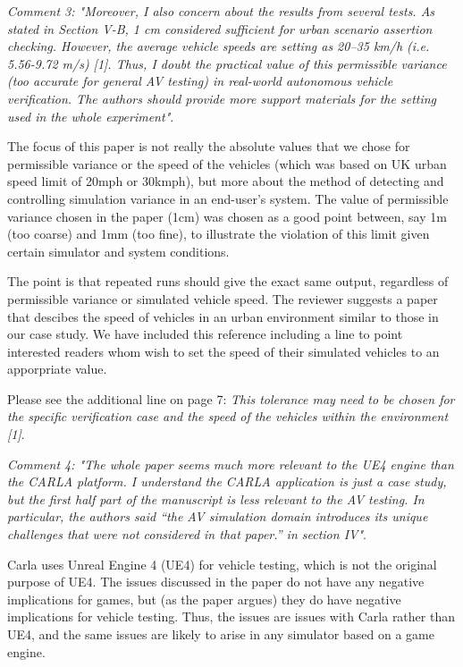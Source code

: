 \documentclass[11pt, a4paper]{letter} %
\begin{document}
\begin{letter}
\textit{Comment 3: "Moreover, I also concern about the results from several tests. As stated in Section V-B, 1 cm considered sufficient for urban scenario assertion checking. However, the average vehicle speeds are setting as 20–35 km/h (i.e. 5.56-9.72 m/s) [1]. Thus, I doubt the practical value of this permissible variance (too accurate for general AV testing) in real-world autonomous vehicle verification. The authors should provide more support materials for the setting used in the whole experiment"}.

The focus of this paper is not really the absolute values that we chose for permissible variance or the speed of the vehicles (which was based on UK urban speed limit of 20mph or 30kmph), but more about the method of detecting and controlling simulation variance in an end-user's system. The value of permissible variance chosen in the paper (1cm) was chosen as a good point between, say 1m (too coarse) and 1mm (too fine), to illustrate the violation of this limit given certain simulator and system conditions.

The point is that repeated runs should give the exact same output, regardless of permissible variance or simulated vehicle speed. The reviewer suggests a paper that descibes the speed of vehicles in an urban environment similar to those in our case study. We have included this reference including a line to point interested readers whom wish to set the speed of their simulated vehicles to an apporpriate value.

Please see the additional line on page 7: \textit{This tolerance may need to be chosen for the specific verification case and the speed of the vehicles within the environment [1]}.

\textit{Comment 4: "The whole paper seems much more relevant to the UE4 engine than the CARLA platform. I understand the CARLA application is just a case study, but the first half part of the manuscript is less relevant to the AV testing. In particular, the authors said “the AV simulation domain introduces its unique challenges that were not considered in that paper.” in section IV"}.

Carla uses Unreal Engine 4 (UE4) for vehicle testing, which is not the original purpose of UE4. The issues discussed in the paper do not have any negative implications for games, but (as the paper argues) they do have negative implications for vehicle testing. Thus, the issues are issues with Carla rather than UE4, and the same issues are likely to arise in any simulator based on a game engine.


\end{letter}
\end{document}
